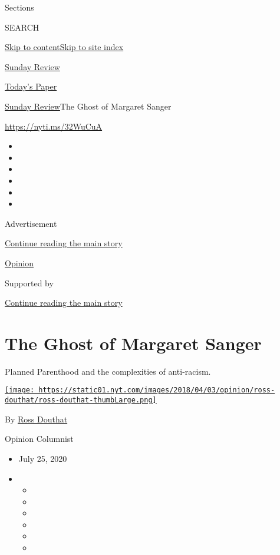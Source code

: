 Sections

SEARCH

\protect\hyperlink{site-content}{Skip to
content}\protect\hyperlink{site-index}{Skip to site index}

\href{https://www.nytimes.com/section/opinion/sunday}{Sunday Review}

\href{https://myaccount.nytimes.com/auth/login?response_type=cookie\&client_id=vi}{}

\href{https://www.nytimes.com/section/todayspaper}{Today's Paper}

\href{/section/opinion/sunday}{Sunday Review}\textbar{}The Ghost of
Margaret Sanger

\url{https://nyti.ms/32WuCuA}

\begin{itemize}
\item
\item
\item
\item
\item
\item
\end{itemize}

Advertisement

\protect\hyperlink{after-top}{Continue reading the main story}

\href{/section/opinion}{Opinion}

Supported by

\protect\hyperlink{after-sponsor}{Continue reading the main story}

\hypertarget{the-ghost-of-margaret-sanger}{%
\section{The Ghost of Margaret
Sanger}\label{the-ghost-of-margaret-sanger}}

Planned Parenthood and the complexities of anti-racism.

\href{https://www.nytimes.com/by/ross-douthat}{\texttt{[image: https://static01.nyt.com/images/2018/04/03/opinion/ross-douthat/ross-douthat-thumbLarge.png]}}

By \href{https://www.nytimes.com/by/ross-douthat}{Ross Douthat}

Opinion Columnist

\begin{itemize}
\item
  July 25, 2020
\item
  \begin{itemize}
  \item
  \item
  \item
  \item
  \item
  \item
  \end{itemize}
\end{itemize}

